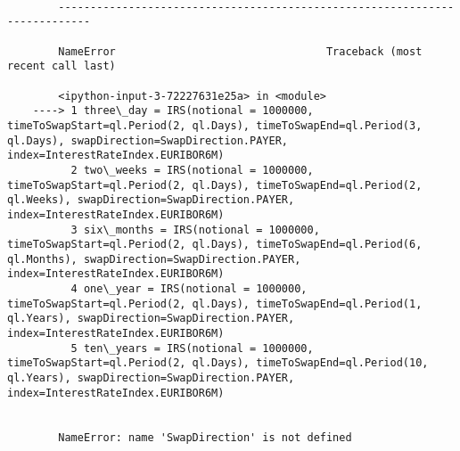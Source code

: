 \documentclass[11pt]{article}
\begin{document}
    \begin{Verbatim}[commandchars=\\\{\}]

        ---------------------------------------------------------------------------

        NameError                                 Traceback (most recent call last)

        <ipython-input-3-72227631e25a> in <module>
    ----> 1 three\_day = IRS(notional = 1000000, timeToSwapStart=ql.Period(2, ql.Days), timeToSwapEnd=ql.Period(3, ql.Days), swapDirection=SwapDirection.PAYER, index=InterestRateIndex.EURIBOR6M)
          2 two\_weeks = IRS(notional = 1000000, timeToSwapStart=ql.Period(2, ql.Days), timeToSwapEnd=ql.Period(2, ql.Weeks), swapDirection=SwapDirection.PAYER, index=InterestRateIndex.EURIBOR6M)
          3 six\_months = IRS(notional = 1000000, timeToSwapStart=ql.Period(2, ql.Days), timeToSwapEnd=ql.Period(6, ql.Months), swapDirection=SwapDirection.PAYER, index=InterestRateIndex.EURIBOR6M)
          4 one\_year = IRS(notional = 1000000, timeToSwapStart=ql.Period(2, ql.Days), timeToSwapEnd=ql.Period(1, ql.Years), swapDirection=SwapDirection.PAYER, index=InterestRateIndex.EURIBOR6M)
          5 ten\_years = IRS(notional = 1000000, timeToSwapStart=ql.Period(2, ql.Days), timeToSwapEnd=ql.Period(10, ql.Years), swapDirection=SwapDirection.PAYER, index=InterestRateIndex.EURIBOR6M)
    

        NameError: name 'SwapDirection' is not defined

    \end{Verbatim}
\end{document}
